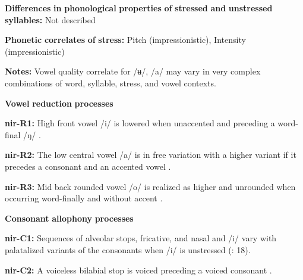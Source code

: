 \begin{styleBody}
\textbf{Differences} \textbf{in} \textbf{phonological} \textbf{properties} \textbf{of} \textbf{stressed} \textbf{and} \textbf{unstressed} \textbf{syllables:} Not described
\end{styleBody}

\begin{styleBody}
\textbf{Phonetic} \textbf{correlates} \textbf{of} \textbf{stress:} Pitch (impressionistic), Intensity (impressionistic)
\end{styleBody}

\begin{styleBody}
\textbf{Notes:} Vowel quality correlate for /ʉ/, /a/ may vary in very complex combinations of word, syllable, stress, and vowel contexts.
\end{styleBody}

\begin{styleBody}
\textbf{Vowel} \textbf{reduction} \textbf{processes}
\end{styleBody}

\begin{styleBody}
\textbf{nir-R1:} High front vowel /i/ is lowered when unaccented and preceding a word-final /ŋ/ \citep[10]{Anceaux1965}.
\end{styleBody}

\begin{styleBody}
\textbf{nir-R2:} The low central vowel /a/ is in free variation with a higher variant if it precedes a consonant and an accented vowel \citep[13]{Anceaux1965}.
\end{styleBody}

\begin{styleBody}
\textbf{nir-R3:} Mid back rounded vowel /o/ is realized as higher and unrounded when occurring word-finally and without accent \citep[14]{Anceaux1965}.
\end{styleBody}

\begin{styleBody}
\textbf{Consonant} \textbf{allophony} \textbf{processes}
\end{styleBody}

\begin{styleBody}
\textbf{nir-C1:} Sequences of alveolar stops, fricative, and nasal and /i/ vary with palatalized variants of the consonants when /i/ is unstressed (\citealt{MayMay1981}: 18).
\end{styleBody}

\begin{styleBody}
\textbf{nir-C2:} A voiceless bilabial stop is voiced preceding a voiced consonant \citep[30]{May1997}.
\end{styleBody}

